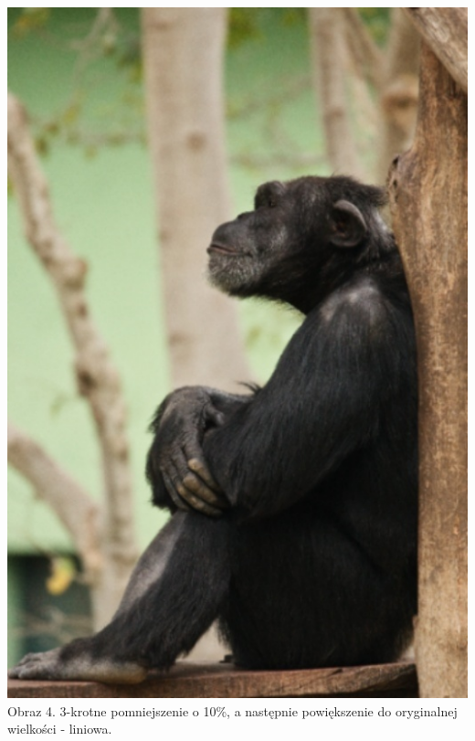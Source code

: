 \documentclass[14pt]{article}
\begin{document}
\begin{center}
    \vspace{0.2cm}
    \includegraphics[scale=0.3]{images/3x_BACK_TO_ORG_bl.jpg}
    \\ \small Obraz 4. 3-krotne pomniejszenie o 10\%, a następnie powiększenie
    do oryginalnej wielkości - liniowa.


\end{center}
\end{document}
